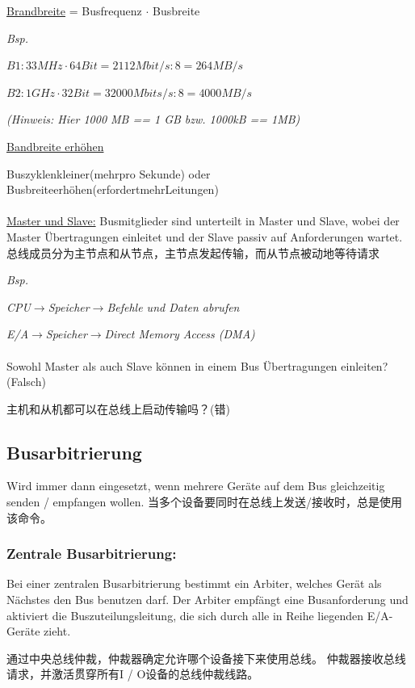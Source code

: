 \documentclass[fleqn]{article}
\begin{document}
\underline{Brandbreite} = Busfrequenz $\cdot$ Busbreite

\noindent\textit{Bsp.}

$B1: 33MHz \cdot 64 Bit = 2112 Mbit/s:8=264MB/s$

$B2: 1GHz\cdot 32Bit = 32000Mbits/s :8=4000MB/s$

\textit{(Hinweis: Hier 1000 MB == 1 GB bzw. 1000kB == 1MB)}

\noindent\underline{Bandbreite erhöhen}

Buszyklenkleiner(mehrpro Sekunde) oder Busbreiteerhöhen(erfordertmehrLeitungen)
\\
\\
\noindent\underline{Master und Slave:} Busmitglieder sind unterteilt in Master und Slave, wobei der Master Übertragungen einleitet und der Slave passiv auf Anforderungen wartet.
总线成员分为主节点和从节点，主节点发起传输，而从节点被动地等待请求

\textit{Bsp.} 

\indent\indent \textit{CPU$\rightarrow$Speicher$\rightarrow$Befehle und Daten abrufen}

\indent\indent \textit{E/A$\rightarrow$Speicher$\rightarrow$Direct Memory Access (DMA)}
\\
\\
Sowohl Master als auch Slave können in einem Bus Übertragungen einleiten? (Falsch)

主机和从机都可以在总线上启动传输吗？(错)

\subsection{Busarbitrierung}

\noindent Wird immer dann eingesetzt, wenn mehrere Geräte auf dem Bus gleichzeitig senden / empfangen wollen. 当多个设备要同时在总线上发送/接收时，总是使用该命令。

\subsubsection{Zentrale Busarbitrierung:}

Bei einer zentralen Busarbitrierung bestimmt ein Arbiter, welches Gerät als Nächstes den Bus benutzen darf. Der Arbiter empfängt eine Busanforderung und aktiviert die Buszuteilungsleitung, die sich durch alle in Reihe liegenden E/A-Geräte zieht.

通过中央总线仲裁，仲裁器确定允许哪个设备接下来使用总线。 仲裁器接收总线请求，并激活贯穿所有I / O设备的总线仲裁线路。
\end{document}

